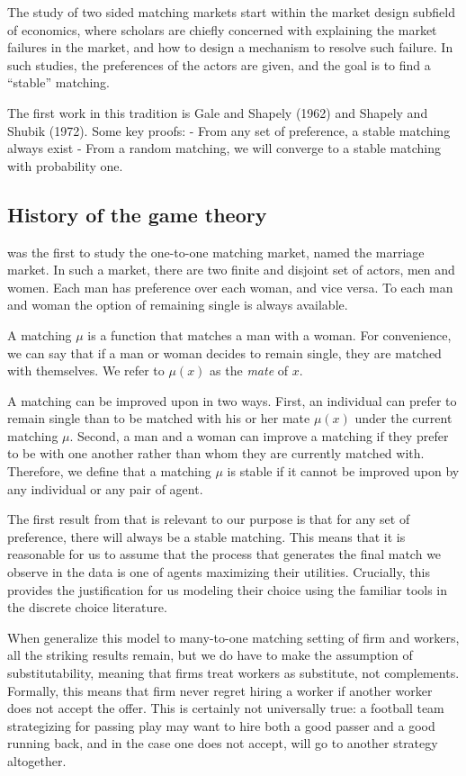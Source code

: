 The study of two sided matching markets start within the market design subfield
of economics, where scholars are chiefly concerned with explaining the market
failures in the market, and how to design a mechanism to resolve such failure.
In such studies, the preferences of the actors are given, and the goal is to
find a ``stable'' matching. 

The first work in this tradition is Gale and Shapely (1962) and Shapely and
Shubik (1972). Some key proofs:
- From any set of preference, a stable matching always exist
- From a random matching, we will converge to a stable matching with probability one.

\subsection{History of the game theory}

\citep{Gale1962} was the first to study the one-to-one matching market, named
the marriage market. In such a market, there are two finite and disjoint set of
actors, men and women. Each man has preference over each woman, and vice versa.
To each man and woman the option of remaining single is always available.

A matching $\mu$ is a function that matches a man with a woman. For convenience,
we can say that if a man or woman decides to remain single, they are matched
with themselves. We refer to $\mu(x)$ as the \textit{mate} of $x$.

A matching can be improved upon in two ways. First, an individual can prefer to
remain single than to be matched with his or her mate $\mu(x)$ under the current
matching $\mu$. Second, a man and a woman can improve a matching if they prefer
to be with one another rather than whom they are currently matched with.
Therefore, we define
that a matching $\mu$ is stable if it cannot be improved upon by any individual
or any pair of agent.  

The first result from \citep{Gale1962} that is relevant to our purpose is that
for any set of preference, there will always be a stable matching. This means
that it is reasonable for us to assume that the process that generates the final
match we observe in the data is one of agents maximizing their utilities.
Crucially, this provides the justification for us modeling their choice using the familiar tools in the
discrete choice literature. 

When generalize this model to many-to-one matching setting of firm and workers,
all the striking results remain, but we do have to make the assumption of
substitutability, meaning that firms treat workers as substitute, not
complements. Formally, this means that firm never regret hiring a worker if
another worker does not accept the offer. This is certainly not universally
true: a football team strategizing for passing play may want to hire both a good
passer and a good running back, and in the case one does not accept, will go to
another strategy altogether.

